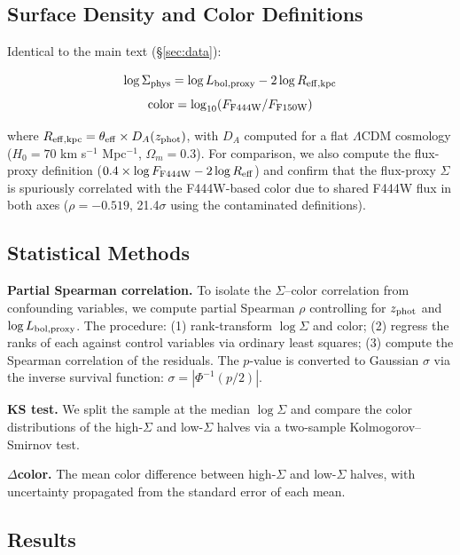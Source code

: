 \documentclass[twocolumn,linenumbers]{aastex631}
\begin{document}
\subsection{Surface Density and Color Definitions}

Identical to the main text (\S\ref{sec:data}):

\begin{equation}
\log \Sigma_{\rm phys} = \log L_{\rm bol, proxy} - 2 \log R_{\rm eff, kpc}
\end{equation}
\begin{equation}
{\rm color} = \log_{10}(F_{\rm F444W} / F_{\rm F150W})
\end{equation}

where $R_{\rm eff, kpc} = \theta_{\rm eff} \times D_A(z_{\rm phot})$, with $D_A$ computed for a flat $\Lambda$CDM cosmology ($H_0 = 70$ km s$^{-1}$ Mpc$^{-1}$, $\Omega_m = 0.3$). For comparison, we also compute the flux-proxy definition ($0.4\times\log F_{\rm F444W} - 2\log R_{\rm eff}$) and confirm that the flux-proxy $\Sigma$ is spuriously correlated with the F444W-based color due to shared F444W flux in both axes ($\rho = -0.519$, 21.4$\sigma$ using the contaminated definitions).

\subsection{Statistical Methods}

\textbf{Partial Spearman correlation.} To isolate the $\Sigma$--color correlation from confounding variables, we compute partial Spearman $\rho$ controlling for $z_{\rm phot}$ and $\log L_{\rm bol, proxy}$. The procedure: (1) rank-transform $\log\Sigma$ and color; (2) regress the ranks of each against control variables via ordinary least squares; (3) compute the Spearman correlation of the residuals. The $p$-value is converted to Gaussian $\sigma$ via the inverse survival function: $\sigma = |\Phi^{-1}(p/2)|$.

\textbf{KS test.} We split the sample at the median $\log\Sigma$ and compare the color distributions of the high-$\Sigma$ and low-$\Sigma$ halves via a two-sample Kolmogorov--Smirnov test.

\textbf{$\Delta$color.} The mean color difference between high-$\Sigma$ and low-$\Sigma$ halves, with uncertainty propagated from the standard error of each mean.

\subsection{Results}
\end{document}
